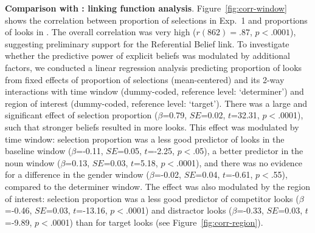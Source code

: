 \documentclass[10pt,letterpaper]{article}
\newcommand{\figref}[1]{Figure~\ref{#1}}
\newcommand{\expref}[1]{Exp.~#1}
\newcommand{\jd}[1]{\textcolor{Red}{\textbf{[jd: #1]}}}
\begin{document}
\textbf{Comparison with : linking function analysis}. \figref{fig:corr-window} shows the correlation between  proportion of selections in \expref{1} and proportions of looks in . The overall correlation was very high ($r(862) = .87$, $p < .0001$), suggesting preliminary support for the Referential Belief link. To investigate whether the predictive power of explicit beliefs was modulated by additional factors, we conducted a linear regression analysis %
predicting proportion of looks from fixed effects of proportion of selections (mean-centered) and its 2-way interactions with time window (dummy-coded, reference level: `determiner') and region of interest (dummy-coded, reference level: `target'). There was a large and significant effect of selection proportion  ($\beta$=0.79, $SE$=0.02, $t$=32.31, $p<$.0001), such that stronger beliefs resulted in more looks. This effect was modulated by time window: selection proportion was a less good predictor of looks in the baseline window   ($\beta$=-0.11, $SE$=0.05, $t$=-2.25, $p<$.05), a better predictor in the noun window   ($\beta$=0.13, $SE$=0.03, $t$=5.18, $p<$.0001), and there was no evidence for a difference in the gender window    ($\beta$=-0.02, $SE$=0.04, $t$=-0.61, $p<$.55), compared to the determiner window. The effect was also modulated by the region of interest: selection proportion was a less good predictor of competitor looks ($\beta$=-0.46, $SE$=0.03, $t$=-13.16, $p<$.0001) and distractor looks  ($\beta$=-0.33, $SE$=0.03, $t$=-9.89, $p<$.0001) than for target looks (see \figref{fig:corr-region}).


\end{document}
